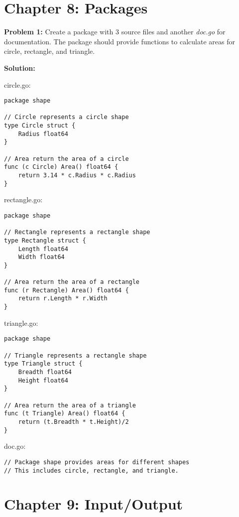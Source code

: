 \section*{Chapter 8: Packages}

{\bf Problem 1:} Create a package with 3 source files and
another \textit{doc.go} for documentation.  The package should provide
functions to calculate areas for circle, rectangle, and triangle.

\textbf{Solution:}

circle.go:

\begin{lstlisting}[numbers=none]
package shape

// Circle represents a circle shape
type Circle struct {
    Radius float64
}

// Area return the area of a circle
func (c Circle) Area() float64 {
    return 3.14 * c.Radius * c.Radius
}
\end{lstlisting}

rectangle.go:

\begin{lstlisting}[numbers=none]
package shape

// Rectangle represents a rectangle shape
type Rectangle struct {
    Length float64
    Width float64
}

// Area return the area of a rectangle
func (r Rectangle) Area() float64 {
    return r.Length * r.Width
}
\end{lstlisting}

triangle.go:

\begin{lstlisting}[numbers=none]
package shape

// Triangle represents a rectangle shape
type Triangle struct {
    Breadth float64
    Height float64
}

// Area return the area of a triangle
func (t Triangle) Area() float64 {
    return (t.Breadth * t.Height)/2
}
\end{lstlisting}

doc.go:

\begin{lstlisting}[numbers=none]
// Package shape provides areas for different shapes
// This includes circle, rectangle, and triangle.
\end{lstlisting}

\section*{Chapter 9: Input/Output}

